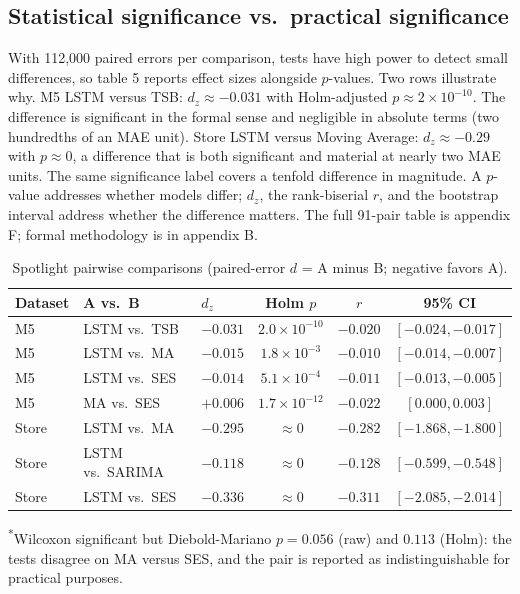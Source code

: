 \subsection{Statistical significance vs.\ practical significance}
\label{sec:sig-vs-pract}
With 112,000 paired errors per comparison, tests have high power to detect
small differences, so table 5 reports effect sizes alongside
$p$-values. Two rows illustrate why. M5 LSTM versus TSB: $d_z \approx -0.031$
with Holm-adjusted $p \approx 2\times10^{-10}$. The difference is significant
in the formal sense and negligible in absolute terms (two hundredths of an
MAE unit). Store LSTM versus Moving Average: $d_z \approx -0.29$ with
$p \approx 0$, a difference that is both significant and material at nearly
two MAE units. The same significance label covers a tenfold difference in
magnitude. A $p$-value addresses whether models differ; $d_z$, the
rank-biserial $r$, and the bootstrap interval address whether the difference
matters. The full 91-pair table is appendix F; formal methodology is in
appendix B.

\begin{table}[H]
\centering
\caption{Spotlight pairwise comparisons (paired-error $d$ = A minus B; negative favors A).}
\label{tab:spotlight}
\begin{tabular}{lllccc}
\toprule
Dataset & A vs.\ B & $d_z$ & Holm $p$ & $r$ & 95\% CI \\
\midrule
M5 & LSTM vs.\ TSB & $-0.031$ & $2.0{\times}10^{-10}$ & $-0.020$ & $[-0.024,-0.017]$ \\
M5 & LSTM vs.\ MA & $-0.015$ & $1.8{\times}10^{-3}$ & $-0.010$ & $[-0.014,-0.007]$ \\
M5 & LSTM vs.\ SES & $-0.014$ & $5.1{\times}10^{-4}$ & $-0.011$ & $[-0.013,-0.005]$ \\
M5 & MA vs.\ SES & $+0.006$ & $1.7{\times}10^{-12}$\rlap{\textsuperscript{*}} & $-0.022$ & $[0.000,0.003]$ \\
Store & LSTM vs.\ MA & $-0.295$ & $\approx$0 & $-0.282$ & $[-1.868,-1.800]$ \\
Store & LSTM vs.\ SARIMA & $-0.118$ & $\approx$0 & $-0.128$ & $[-0.599,-0.548]$ \\
Store & LSTM vs.\ SES & $-0.336$ & $\approx$0 & $-0.311$ & $[-2.085,-2.014]$ \\
\bottomrule
\end{tabular}
\end{table}
\noindent\textsuperscript{*}Wilcoxon significant but Diebold-Mariano $p=0.056$
(raw) and $0.113$ (Holm): the tests disagree on MA versus SES, and the pair
is reported as indistinguishable for practical purposes.

